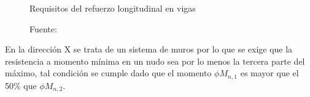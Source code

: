 \begin{figure}[h!]
    \centering
    \caption{Requisitos del refuerzo longitudinal en vigas}
    \hspace{0mm}
    \caption*{Fuente: \cite{CAPUCP}}
    \label{reqv}
\end{figure}

\noindent En la dirección X se trata de un sistema de muros por lo que se exige que la resistencia a momento mínima en un nudo sea por lo menos la tercera parte del máximo, tal condición se cumple dado que el momento $\phi M_{n,1}$ es mayor que el 50\% que $\phi M_{n,2}$.

